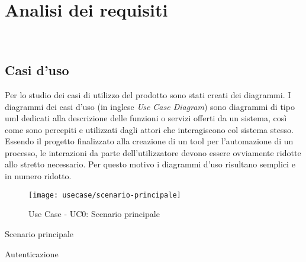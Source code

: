 
\chapter{Analisi dei requisiti}
\label{cap:analisi-requisiti}

\\

\section{Casi d'uso}

Per lo studio dei casi di utilizzo del prodotto sono stati creati dei diagrammi.
I diagrammi dei casi d'uso (in inglese \emph{Use Case Diagram}) sono diagrammi di tipo \gls{uml} dedicati alla descrizione delle funzioni o servizi offerti da un sistema, così come sono percepiti e utilizzati dagli attori che interagiscono col sistema stesso.
Essendo il progetto finalizzato alla creazione di un tool per l'automazione di un processo, le interazioni da parte dell'utilizzatore devono essere ovviamente ridotte allo stretto necessario. Per questo motivo i diagrammi d'uso risultano semplici e in numero ridotto.

\begin{figure}[!h] 
    \centering 
    \texttt{[image: usecase/scenario-principale]} 
    \caption{Use Case - UC0: Scenario principale}
\end{figure}

\begin{usecase}{0}{Scenario principale}
\label{uc:scenario-principale}
\end{usecase}

\begin{usecase}{1}{Autenticazione}
\label{uc:autenticazione}
\end{usecase}

